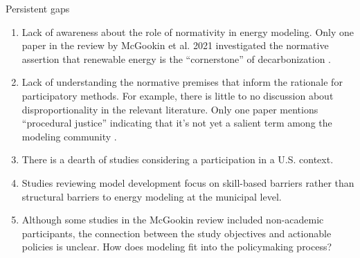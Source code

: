 Persistent gaps

\begin{enumerate}
    \item Lack of awareness about the role of normativity in energy modeling. Only one 
    paper in the review by McGookin et al. 2021 investigated the normative assertion 
    that renewable energy is the ``cornerstone'' of decarbonization \cite{zelt_long-term_2019}.
    \item Lack of understanding the normative premises that inform the rationale
    for participatory methods. For example, there is little to no discussion about 
    disproportionality in the relevant literature. Only one paper mentions ``procedural justice''
    indicating that it's not yet a salient term among the modeling community \cite{knudsen_local_2015}.
    \item There is a dearth of studies considering a participation in a U.S. context.
    \item Studies reviewing model development focus on skill-based barriers rather than
    structural barriers to energy modeling at the municipal level.
    \item Although some studies in the McGookin review included non-academic participants, the
    connection between the study objectives and actionable policies is unclear. How does modeling
    fit into the policymaking process?
\end{enumerate}

